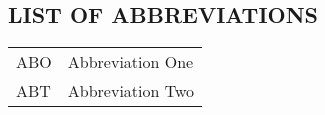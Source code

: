 \begin{center}
	\section*{LIST OF ABBREVIATIONS}
	\setcounter{section}{0}
\end{center}
\vspace{5mm}


\begin{longtable}{p{2cm} l}
	ABO & Abbreviation One \\
	ABT & Abbreviation Two\\

\end{longtable}
	
	
	
